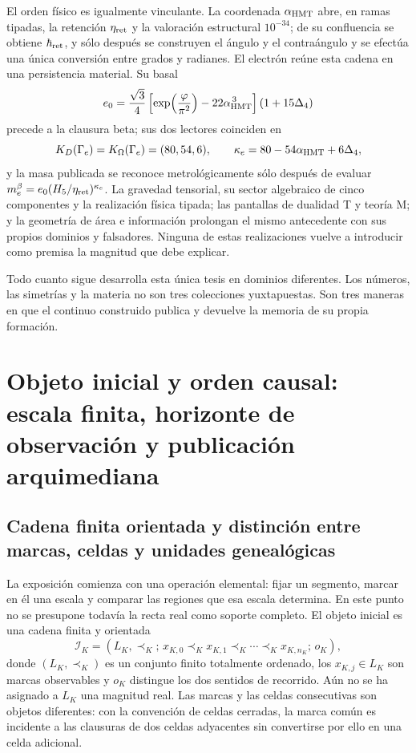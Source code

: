 El orden físico es igualmente vinculante. La coordenada
\(\alpha_{\rm HMT}\) abre, en ramas tipadas, la retención
\(\eta_{\rm ret}\) y la valoración estructural \(10^{-34}\); de su confluencia
se obtiene \(\hbar_{\rm ret}\), y sólo después se construyen el ángulo y el
contraángulo y se efectúa una única conversión entre grados y radianes. El
electrón reúne esta cadena en una persistencia material. Su basal
\[
e_0=
\frac{\sqrt3}{4}
\left[
\exp\!\left(\frac{\varphi}{\pi^2}\right)
-22\alpha_{\rm HMT}^{\,3}
\right](1+15\Delta_4)
\]
precede a la clausura beta; sus dos lectores coinciden en
\[
K_D(\Gamma_e)=K_\Omega(\Gamma_e)=(80,54,6),
\qquad
\kappa_e=80-54\alpha_{\rm HMT}+6\Delta_4,
\]
y la masa publicada se reconoce metrológicamente sólo después de evaluar
\(m_e^\beta=e_0(H_5/\eta_{\rm ret})^{\kappa_e}\). La gravedad tensorial, su
sector algebraico de cinco componentes y la realización física tipada; las
pantallas de dualidad T y teoría M; y la geometría de área e información
prolongan el mismo antecedente con sus propios dominios y falsadores. Ninguna
de estas realizaciones vuelve a introducir como premisa la magnitud que debe
explicar.

Todo cuanto sigue desarrolla esta única tesis en dominios diferentes. Los
números, las simetrías y la materia no son tres colecciones yuxtapuestas. Son
tres maneras en que el continuo construido publica y devuelve la memoria de
su propia formación.

\section{Objeto inicial y orden causal: escala finita, horizonte de observación y publicación arquimediana}

\subsection*{Cadena finita orientada y distinción entre marcas, celdas y unidades genealógicas}

La exposición comienza con una operación elemental: fijar un segmento,
marcar en él una escala y comparar las regiones que esa escala determina. En
este punto no se presupone todavía la recta real como soporte completo. El
objeto inicial es una cadena finita y orientada
\[
 \mathcal I_K=(L_K,\prec_K;\,
 x_{K,0}\prec_K x_{K,1}\prec_K\cdots\prec_K x_{K,n_K};\,o_K),
\]
donde \((L_K,\prec_K)\) es un conjunto finito totalmente ordenado, los
\(x_{K,j}\in L_K\) son marcas observables y \(o_K\) distingue los dos
sentidos de recorrido. Aún no se ha asignado a \(L_K\) una magnitud real.
Las marcas y las celdas consecutivas son objetos diferentes: con la
convención de celdas cerradas, la marca común es incidente a las clausuras
de dos celdas adyacentes sin convertirse por ello en una celda adicional.

